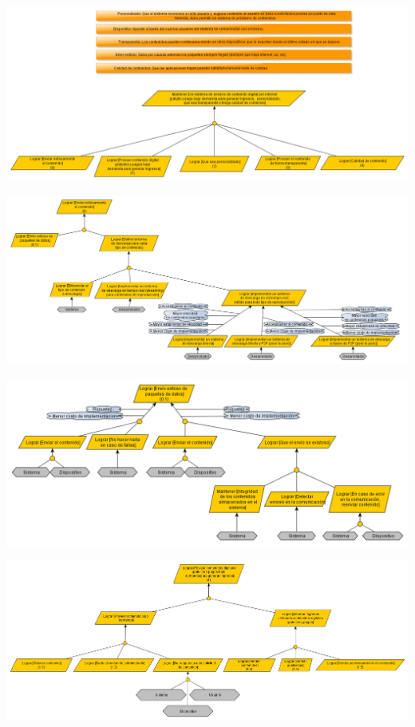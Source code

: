 \documentclass[11pt, a4paper, spanish]{article}
\begin{document}
	\begin{center}
		\includegraphics[scale=0.35]{Diagramas/ModelodeObjetivosPrincipal.png}
	\end{center}
\newpage
	\begin{center}
		\includegraphics[scale=0.35]{Diagramas/0ModelodeObjetivosLograrenviarcontenido.png}
	\end{center}
\newpage
	\begin{center}
		\includegraphics[scale=0.35]{Diagramas/0-1ModelodeObjetivosEnvioexitoso.png}
	\end{center}
\newpage
	\begin{center}
		\includegraphics[scale=0.35]{Diagramas/1ModelodeObjetivosGenerarIngresos.png}
	\end{center}
\end{document}
